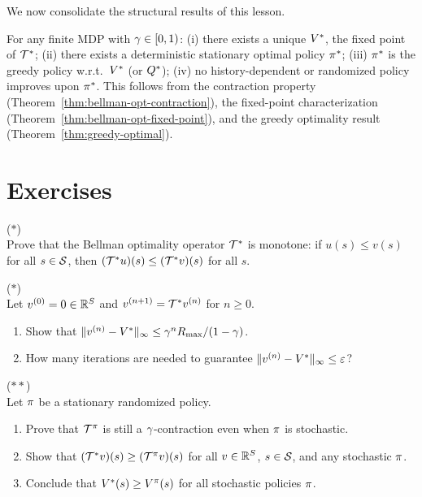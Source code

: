 \documentclass[11pt,a4paper]{article}
\begin{document}
We now consolidate the structural results of this lesson.

\begin{keyresult}[title={Fundamental Theorem of MDPs}]
For any finite MDP with $\gamma \in [0,1)$: (i) there exists a
unique $V^*$, the fixed point of $\mathcal{T}^*$; (ii) there exists
a deterministic stationary optimal policy $\pi^*$; (iii)
$\pi^*$ is the greedy policy w.r.t.\ $V^*$ (or $Q^*$);
(iv) no history-dependent or randomized policy improves upon
$\pi^*$. This follows from the contraction property
(Theorem~\ref{thm:bellman-opt-contraction}), the fixed-point
characterization (Theorem~\ref{thm:bellman-opt-fixed-point}), and
the greedy optimality result (Theorem~\ref{thm:greedy-optimal}).
\end{keyresult}


\section{Exercises}
\label{sec:exercises}

\begin{exercise} \textnormal{(\(*\))} \\
Prove that the Bellman optimality operator $\mathcal{T}^*$ is monotone:
if $u(s) \leq v(s)$ for all $s \in \mathcal{S}$, then
$(\mathcal{T}^* u)(s) \leq (\mathcal{T}^* v)(s)$ for all $s$.
\end{exercise}

\begin{exercise}
\textnormal{(\(*\))} \\
Let $v^{(0)} = 0 \in \mathbb{R}^S$ and $v^{(n+1)} = \mathcal{T}^* v^{(n)}$ for
$n \geq 0$.
\begin{enumerate}[label=(\alph*)]
    \item Show that $\|v^{(n)} - V^*\|_\infty \leq
    \gamma^n R_{\max} / (1 - \gamma)$.
    \item How many iterations are needed to guarantee
    $\|v^{(n)} - V^*\|_\infty \leq \varepsilon$?
\end{enumerate}
\end{exercise}

\begin{exercise}
\textnormal{(\(**\))} \\
Let $\pi$ be a stationary randomized policy.
\begin{enumerate}[label=(\alph*)]
    \item Prove that $\mathcal{T}^\pi$ is still a
    $\gamma$-contraction even when $\pi$ is stochastic.
    \item Show that $(\mathcal{T}^* v)(s) \geq (\mathcal{T}^\pi v)(s)$
    for all $v \in \mathbb{R}^S$, $s \in \mathcal{S}$, and any stochastic
    $\pi$.
    \item Conclude that $V^*(s) \geq V^{\pi}(s)$ for all stochastic
    policies $\pi$.
\end{enumerate}
\end{exercise}
\end{document}
